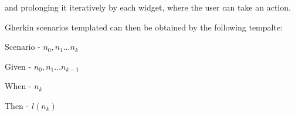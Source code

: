and prolonging it iteratively by each widget, where the user can take an action.

Gherkin scenarios templated can then be obtained by the following tempalte:

Scenario - $n_0,n_1 \ldots n_k$

Given - $n_0, n_1 \ldots n_{k-1}$

When - $n_k$

Then - $l(n_k)$











